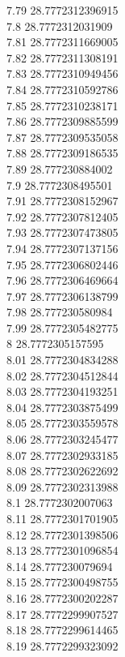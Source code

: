 {7.79	28.7772312396915\\
7.8	28.7772312031909\\
7.81	28.7772311669005\\
7.82	28.7772311308191\\
7.83	28.7772310949456\\
7.84	28.7772310592786\\
7.85	28.7772310238171\\
7.86	28.7772309885599\\
7.87	28.7772309535058\\
7.88	28.7772309186535\\
7.89	28.777230884002\\
7.9	28.7772308495501\\
7.91	28.7772308152967\\
7.92	28.7772307812405\\
7.93	28.7772307473805\\
7.94	28.7772307137156\\
7.95	28.7772306802446\\
7.96	28.7772306469664\\
7.97	28.7772306138799\\
7.98	28.777230580984\\
7.99	28.7772305482775\\
8	28.7772305157595\\
8.01	28.7772304834288\\
8.02	28.7772304512844\\
8.03	28.7772304193251\\
8.04	28.7772303875499\\
8.05	28.7772303559578\\
8.06	28.7772303245477\\
8.07	28.7772302933185\\
8.08	28.7772302622692\\
8.09	28.7772302313988\\
8.1	28.7772302007063\\
8.11	28.7772301701905\\
8.12	28.7772301398506\\
8.13	28.7772301096854\\
8.14	28.777230079694\\
8.15	28.7772300498755\\
8.16	28.7772300202287\\
8.17	28.7772299907527\\
8.18	28.7772299614465\\
8.19	28.7772299323092\\
}
